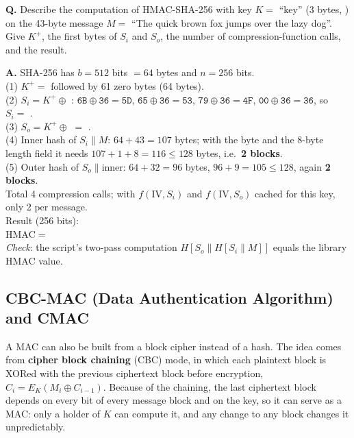 \begin{worked}
\textbf{Q.} Describe the computation of HMAC-SHA-256 with key $K = $ ``key'' (3 bytes, ) on the 43-byte message $M = $ ``The quick brown fox jumps over the lazy dog''. Give $K^+$, the first bytes of $S_i$ and $S_o$, the number of compression-function calls, and the result.

\textbf{A.} SHA-256 has $b = 512$ bits $= 64$ bytes and $n = 256$ bits.\\
(1) $K^+ = $  followed by 61 zero bytes (64 bytes).\\
(2) $S_i = K^+ \oplus$ : $\texttt{6B} \oplus \texttt{36} = \texttt{5D}$, $\texttt{65} \oplus \texttt{36} = \texttt{53}$, $\texttt{79} \oplus \texttt{36} = \texttt{4F}$, $\texttt{00} \oplus \texttt{36} = \texttt{36}$, so $S_i = $ .\\
(3) $S_o = K^+ \oplus$  $=$ .\\
(4) Inner hash of $S_i \| M$: $64 + 43 = 107$ bytes; with the  byte and the 8-byte length field it needs $107 + 1 + 8 = 116 \le 128$ bytes, i.e.\ \textbf{2 blocks}.\\
(5) Outer hash of $S_o \| \text{inner}$: $64 + 32 = 96$ bytes, $96 + 9 = 105 \le 128$, again \textbf{2 blocks}.\\
Total 4 compression calls; with $f(\mathrm{IV}, S_i)$ and $f(\mathrm{IV}, S_o)$ cached for this key, only 2 per message.\\
Result (256 bits):\\
\hspace*{1.5em}$\mathrm{HMAC} = $ \\
\emph{Check}: the script's two-pass computation $H[S_o \| H[S_i \| M]]$ equals the library HMAC value.
\end{worked}

\subsection{CBC-MAC (Data Authentication Algorithm) and CMAC \new}

A MAC can also be built from a block cipher instead of a hash. The idea comes from \textbf{cipher block chaining} (CBC) mode, in which each plaintext block is XORed with the previous ciphertext block before encryption, $C_i = E_K(M_i \oplus C_{i-1})$. Because of the chaining, the last ciphertext block depends on every bit of every message block and on the key, so it can serve as a MAC: only a holder of $K$ can compute it, and any change to any block changes it unpredictably.

